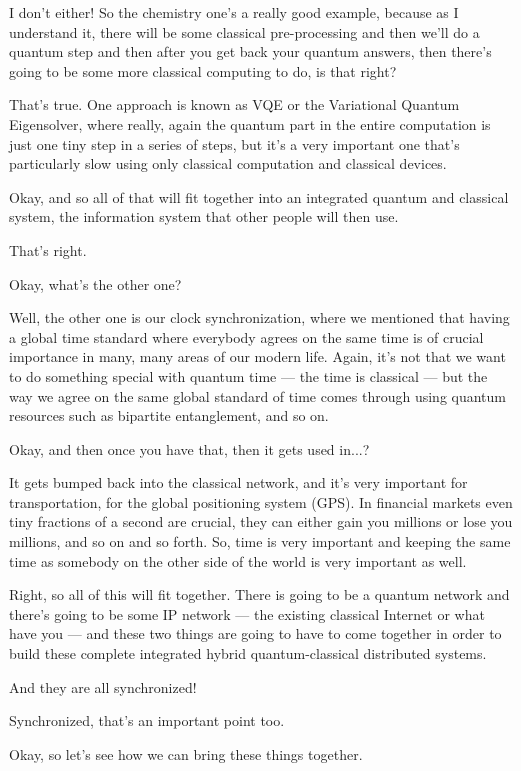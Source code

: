 \rrr I don't either! So the chemistry one's a really good example, because as I understand it, there will be some classical pre-processing and then we'll do a quantum step and then after you get back your quantum answers, then there's going to be some more classical computing to do, is that right?

\mmm That's true. One approach is known as VQE or the Variational Quantum Eigensolver, where really, again the quantum part in the entire computation is just one tiny step in a series of steps, but it's a very important one that's particularly slow using only classical computation and classical devices.

\rrr Okay, and so all of that will fit together into an integrated quantum and classical system, the information system that other people will then use.

\mmm That's right.

\rrr Okay, what's the other one?

\mmm Well, the other one is our clock synchronization, where we mentioned that having a global time standard where everybody agrees on the same time is of crucial importance in many, many areas of our modern life. Again, it's not that we want to do something special with quantum time --- the time is classical --- but the way we agree on the same global standard of time comes through using quantum resources such as bipartite entanglement, and so on.

\rrr Okay, and then once you have that, then it gets used in...?

\mmm It gets bumped back into the classical network, and it's very important for transportation, for the global positioning system (GPS). In financial markets even tiny fractions of a second are crucial, they can either gain you millions or lose you millions, and so on and so forth. So, time is very important and keeping the same time as somebody on the other side of the world is very important as well.

\rrr Right, so all of this will fit together. There is going to be a quantum network and there's going to be some IP network --- the existing classical Internet or what have you --- and these two things are going to have to come together in order to build these complete integrated hybrid quantum-classical distributed systems.

\mmm And they are all synchronized!

\rrr Synchronized, that's an important point too.

\mmm Okay, so let's see how we can bring these things together.

